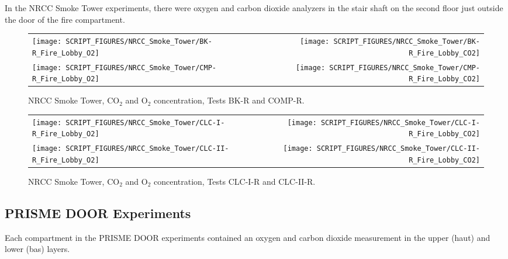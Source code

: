 In the NRCC Smoke Tower experiments, there were oxygen and carbon dioxide analyzers in the stair shaft on the second floor just outside the door of the fire compartment.

\begin{figure}[!ht]
\begin{tabular*}{\textwidth}{l@{\extracolsep{\fill}}r}
\texttt{[image: SCRIPT\_FIGURES/NRCC\_Smoke\_Tower/BK-R\_Fire\_Lobby\_O2]} &
\texttt{[image: SCRIPT\_FIGURES/NRCC\_Smoke\_Tower/BK-R\_Fire\_Lobby\_CO2]} \\
\texttt{[image: SCRIPT\_FIGURES/NRCC\_Smoke\_Tower/CMP-R\_Fire\_Lobby\_O2]} &
\texttt{[image: SCRIPT\_FIGURES/NRCC\_Smoke\_Tower/CMP-R\_Fire\_Lobby\_CO2]}
\end{tabular*}
\caption[NRCC Smoke Tower, CO$_2$ and O$_2$ concentration, Tests BK-R and COMP-R]{NRCC Smoke Tower, CO$_2$ and O$_2$ concentration, Tests BK-R and COMP-R.}
\label{NRCC_Smoke_Tower_O2_CO2_1}
\end{figure}

\begin{figure}[!ht]
\begin{tabular*}{\textwidth}{l@{\extracolsep{\fill}}r}
\texttt{[image: SCRIPT\_FIGURES/NRCC\_Smoke\_Tower/CLC-I-R\_Fire\_Lobby\_O2]} &
\texttt{[image: SCRIPT\_FIGURES/NRCC\_Smoke\_Tower/CLC-I-R\_Fire\_Lobby\_CO2]} \\
\texttt{[image: SCRIPT\_FIGURES/NRCC\_Smoke\_Tower/CLC-II-R\_Fire\_Lobby\_O2]} &
\texttt{[image: SCRIPT\_FIGURES/NRCC\_Smoke\_Tower/CLC-II-R\_Fire\_Lobby\_CO2]}
\end{tabular*}
\caption[NRCC Smoke Tower, CO$_2$ and O$_2$ concentration, Tests CLC-I-R and CLC-II-R]{NRCC Smoke Tower, CO$_2$ and O$_2$ concentration, Tests CLC-I-R and CLC-II-R.}
\label{NRCC_Smoke_Tower_O2_CO2_2}
\end{figure}


\clearpage

\subsection{PRISME DOOR Experiments}

Each compartment in the PRISME DOOR experiments contained an oxygen and carbon dioxide measurement in the upper (haut) and lower (bas) layers.

